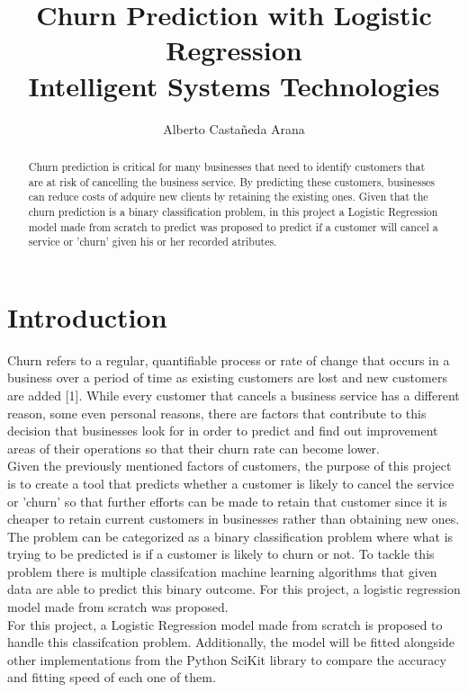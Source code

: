 \documentclass[letterpaper, 10 pt, conference]{ieeeconf}
\title{\bf
Churn Prediction with Logistic Regression \large  \\
Intelligent Systems Technologies
}
\author{Alberto Castañeda Arana %
}
\begin{document}
\maketitle
\thispagestyle{empty}
\pagestyle{empty}


\begin{abstract}
Churn prediction is critical for many businesses that need to identify customers that are at risk of cancelling the business service.
By predicting these customers, businesses can reduce costs of adquire new clients by retaining the existing ones. Given that the churn
prediction is a binary classification problem, in this project a Logistic Regression model made from scratch to predict was proposed to
predict if a customer will cancel a service or 'churn' given his or her recorded atributes. 
\end{abstract}

\section{ Introduction }
Churn refers to a regular, quantifiable process or rate of change that occurs in a business over a period of time as existing customers are
lost and new customers are added [1]. While every customer that cancels a business service has a different reason, some even personal reasons,
there are factors that contribute to this decision that businesses look for in order to predict and find out improvement areas of their operations 
so that their churn rate can become lower. \\

Given the previously mentioned factors of customers, the purpose of this project is to create a tool that predicts whether a customer is likely to cancel the service
or 'churn' so that further efforts can be made to retain that customer since it is cheaper to retain current customers in businesses rather than obtaining new ones. \\


The problem can be categorized as a binary classification problem where what is trying to be predicted is if a customer is likely to churn or not.
To tackle this problem there is multiple classifcation machine learning algorithms that given data are able to predict this binary outcome.
For this project, a logistic regression model made from scratch was proposed. \\

For this project, a Logistic Regression model made from scratch is proposed to handle this classifcation problem. Additionally, the model
will be fitted alongside other implementations from the Python SciKit library to compare the accuracy and fitting speed of each one of them.
\end{document}

